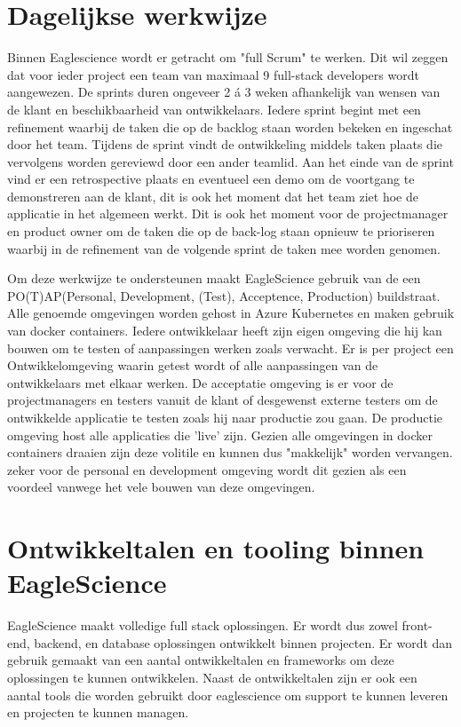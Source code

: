 \section{Dagelijkse werkwijze}\label{sec:dagelijkse-werkwijze}
Binnen Eaglescience wordt er getracht om "full Scrum" te werken. Dit wil zeggen dat voor ieder project een team van maximaal 9 full-stack developers wordt aangewezen. De sprints duren ongeveer 2 á 3 weken afhankelijk van wensen van de klant en beschikbaarheid van ontwikkelaars. Iedere sprint begint met een refinement waarbij de taken die op de backlog staan worden bekeken en ingeschat door het team. Tijdens de sprint vindt de ontwikkeling middels taken plaats die vervolgens worden gereviewd door een ander teamlid. Aan het einde van de sprint vind er een retrospective plaats en eventueel een demo om de voortgang te demonstreren aan de klant, dit is ook het moment dat het team ziet hoe de applicatie in het algemeen werkt. Dit is ook het moment voor de projectmanager en product owner om de taken die op de back-log staan opnieuw te prioriseren waarbij in de refinement van de volgende sprint de taken mee worden genomen.

Om deze werkwijze te ondersteunen maakt EagleScience gebruik van de een PO(T)AP(Personal, Development, (Test), Acceptence, Production) buildstraat. Alle genoemde omgevingen worden gehost in Azure Kubernetes en maken gebruik van docker containers. Iedere ontwikkelaar heeft zijn eigen omgeving die hij kan bouwen om te testen of aanpassingen werken zoals verwacht. Er is per project een Ontwikkelomgeving waarin getest wordt of alle aanpassingen van de ontwikkelaars met elkaar werken. De acceptatie omgeving is er voor de projectmanagers en testers vanuit de klant of desgewenst externe testers om de ontwikkelde applicatie te testen zoals hij naar productie zou gaan. De productie omgeving host alle applicaties die 'live' zijn. Gezien alle omgevingen in docker containers draaien zijn deze volitile en kunnen dus "makkelijk" worden vervangen. zeker voor de personal en development omgeving wordt dit gezien als een voordeel vanwege het vele bouwen van deze omgevingen.
\section{Ontwikkeltalen en tooling binnen EagleScience}\label{sec:ontwikkeltalen-en-tooling-binnen-eaglescience}
EagleScience maakt volledige full stack oplossingen. Er wordt dus zowel front-end, backend, en database oplossingen ontwikkelt binnen projecten. Er wordt dan gebruik gemaakt van een aantal ontwikkeltalen en frameworks om deze oplossingen te kunnen ontwikkelen. Naast de ontwikkeltalen zijn er ook een aantal tools die worden gebruikt door eaglescience om support te kunnen leveren en projecten te kunnen managen.

